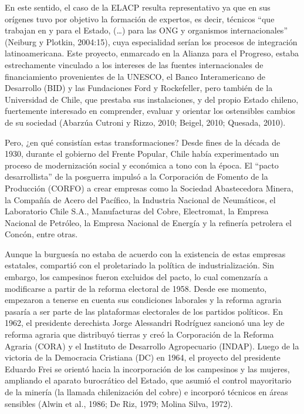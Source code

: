 En este sentido, el caso de la ELACP resulta representativo ya que en sus orígenes tuvo por objetivo la formación de expertos, es decir, técnicos ``que trabajan en y para el Estado, (\ldots) para las ONG y organismos internacionales'' (Neiburg y Plotkin, 2004:15), cuya especialidad serían los procesos de integración latinoamericana. Este proyecto, enmarcado en la Alianza para el Progreso, estaba estrechamente vinculado a los intereses de las fuentes internacionales de financiamiento provenientes de la UNESCO, el Banco Interamericano de Desarrollo (BID) y las Fundaciones Ford y Rockefeller, pero también de la Universidad de Chile, que prestaba sus instalaciones, y del propio Estado chileno, fuertemente interesado en comprender, evaluar y orientar los ostensibles cambios de su sociedad (Abarzúa Cutroni y Rizzo, 2010; Beigel, 2010; Quesada, 2010).

Pero, ¿en qué consistían estas transformaciones? Desde fines de la década de 1930, durante el gobierno del Frente Popular, Chile había experimentado un proceso de modernización social y económica a tono con la época. El ``pacto desarrollista'' de la posguerra impulsó a la Corporación de Fomento de la Producción (CORFO) a crear empresas como la Sociedad Abastecedora Minera, la Compañía de Acero del Pacífico, la Industria Nacional de Neumáticos, el Laboratorio Chile S.A., Manufacturas del Cobre, Electromat, la Empresa Nacional de Petróleo, la Empresa Nacional de Energía y la refinería petrolera el Concón, entre otras.

Aunque la burguesía no estaba de acuerdo con la existencia de estas empresas estatales, compartió con el proletariado la política de industrialización. Sin embargo, los campesinos fueron excluidos del pacto, lo cual comenzaría a modificarse a partir de la reforma electoral de 1958. Desde ese momento, empezaron a tenerse en cuenta sus condiciones laborales y la reforma agraria pasaría a ser parte de las plataformas electorales de los partidos políticos. En 1962, el presidente derechista Jorge Alessandri Rodríguez sancionó una ley de reforma agraria que distribuyó tierras y creó la Corporación de la Reforma Agraria (CORA) y el Instituto de Desarrollo Agropecuario (INDAP). Luego de la victoria de la Democracia Cristiana (DC) en 1964, el proyecto del presidente Eduardo Frei se orientó hacia la incorporación de los campesinos y las mujeres, ampliando el aparato burocrático del Estado, que asumió el control mayoritario de la minería (la llamada chilenización del cobre) e incorporó técnicos en áreas sensibles (Alwin et al., 1986; De Riz, 1979; Molina Silva, 1972).

